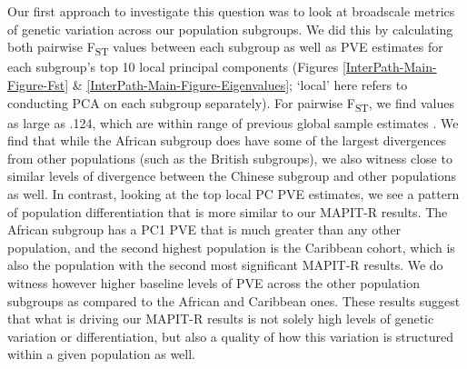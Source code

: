 \documentclass[12pt,a4paper]{article}
\begin{document}
Our first approach to investigate this question was to look at broadscale metrics of genetic variation across our population subgroups. We did this by calculating both pairwise F\textsubscript{ST} values between each subgroup as well as PVE estimates for each subgroup's top 10 local principal components (Figures \ref{InterPath-Main-Figure-Fst} \& \ref{InterPath-Main-Figure-Eigenvalues}; `local' here refers to conducting PCA on each subgroup separately). For pairwise F\textsubscript{ST}, we find values as large as .124, which are within range of previous global sample estimates \citep{Ramachandran2005,Weir2005,Wang2012,Sugden2016}. We find that while the African subgroup does have some of the largest divergences from other populations (such as the British subgroups), we also witness close to similar levels of divergence between the Chinese subgroup and other populations as well. In contrast, looking at the top local PC PVE estimates, we see a pattern of population differentiation that is more similar to our MAPIT-R results. The African subgroup has a PC1 PVE that is much greater than any other population, and the second highest population is the Caribbean cohort, which is also the population with the second most significant MAPIT-R results. We do witness however higher baseline levels of PVE across the other population subgroups as compared to the African and Caribbean ones. These results suggest that what is driving our MAPIT-R results is not solely high levels of genetic variation or differentiation, but also a quality of how this variation is structured within a given population as well.

\end{document}
